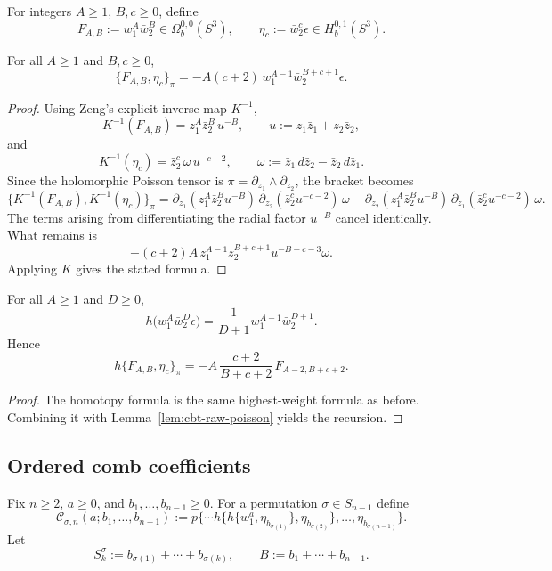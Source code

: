 For integers $A\ge1$, $B,c\ge0$, define
\[
F_{A,B}:=w_1^A\bar w_2^B\in \Omega_b^{0,0}(S^3),
\qquad
\eta_c:=\bar w_2^c\epsilon\in H_b^{0,1}(S^3).
\]

\begin{lemma}
\label{lem:cbt-raw-poisson}
\ClaimStatusProvedHere
For all $A\ge1$ and $B,c\ge0$,
\[
\{F_{A,B},\eta_c\}_\pi
=
-A(c+2)\,w_1^{A-1}\bar w_2^{B+c+1}\epsilon.
\]
\end{lemma}

\begin{proof}
Using Zeng's explicit inverse map $K^{-1}$,
\[
K^{-1}(F_{A,B})=z_1^A\bar z_2^B\,u^{-B},
\qquad
u:=z_1\bar z_1+z_2\bar z_2,
\]
and
\[
K^{-1}(\eta_c)=\bar z_2^c\,\omega\,u^{-c-2},
\qquad
\omega:=\bar z_1\,d\bar z_2-\bar z_2\,d\bar z_1.
\]
Since the holomorphic Poisson tensor is $\pi=\partial_{z_1}\wedge \partial_{z_2}$, the bracket becomes
\[
\{K^{-1}(F_{A,B}),K^{-1}(\eta_c)\}_\pi
=
\partial_{z_1}(z_1^A\bar z_2^Bu^{-B})\,\partial_{z_2}(\bar z_2^cu^{-c-2})\,\omega
-
\partial_{z_2}(z_1^A\bar z_2^Bu^{-B})\,\partial_{z_1}(\bar z_2^cu^{-c-2})\,\omega.
\]
The terms arising from differentiating the radial factor $u^{-B}$ cancel identically. What remains is
\[
-(c+2)A\,z_1^{A-1}\bar z_2^{B+c+1}u^{-B-c-3}\omega.
\]
Applying $K$ gives the stated formula.
\end{proof}

\begin{lemma}
\label{lem:cbt-propagator-poisson}
\ClaimStatusProvedHere
For all $A\ge1$ and $D\ge0$,
\[
h\bigl(w_1^A\bar w_2^D\epsilon\bigr)=\frac{1}{D+1}w_1^{A-1}\bar w_2^{D+1}.
\]
Hence
\[
h\{F_{A,B},\eta_c\}_\pi
=
-A\,\frac{c+2}{B+c+2}\,F_{A-2,B+c+2}.
\]
\end{lemma}

\begin{proof}
The homotopy formula is the same highest-weight formula as before. Combining it with Lemma~\ref{lem:cbt-raw-poisson} yields the recursion.
\end{proof}

\subsection{Ordered comb coefficients}
\label{sec:cbt-ordered-comb}

Fix $n\ge2$, $a\ge0$, and $b_1,\dots,b_{n-1}\ge0$. For a permutation $\sigma\in S_{n-1}$ define
\[
\mathcal C_{\sigma,n}(a;b_1,\dots,b_{n-1})
:=
p\{\cdots h\{h\{w_1^a,\eta_{b_{\sigma(1)}}\},\eta_{b_{\sigma(2)}}\},\dots,\eta_{b_{\sigma(n-1)}}\}.
\]
Let
\[
S_k^\sigma:=b_{\sigma(1)}+\cdots+b_{\sigma(k)},
\qquad
B:=b_1+\cdots+b_{n-1}.
\]

